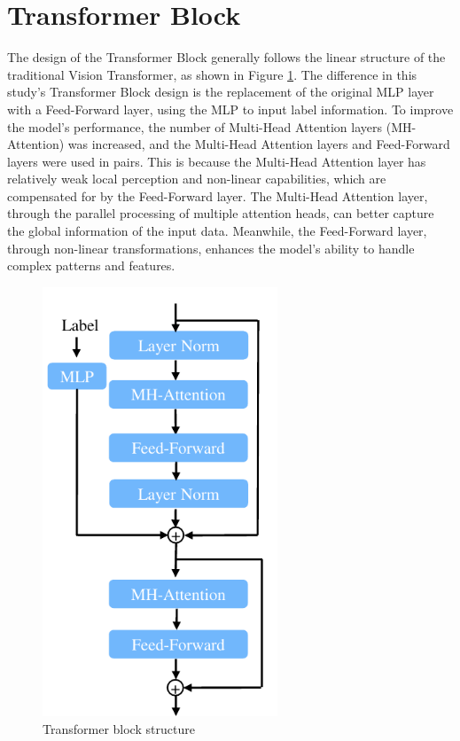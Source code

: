\documentclass[12pt]{report}
\begin{document}
\section{Transformer Block}
The design of the Transformer Block generally follows the linear structure of the traditional Vision Transformer, as shown in Figure \ref{fig:Transformer_Block}. The difference in this study's Transformer Block design is the replacement of the original MLP layer with a Feed-Forward layer, using the MLP to input label information. To improve the model's performance, the number of Multi-Head Attention layers (MH-Attention) was increased, and the Multi-Head Attention layers and Feed-Forward layers were used in pairs. This is because the Multi-Head Attention layer has relatively weak local perception and non-linear capabilities, which are compensated for by the Feed-Forward layer. The Multi-Head Attention layer, through the parallel processing of multiple attention heads, can better capture the global information of the input data. Meanwhile, the Feed-Forward layer, through non-linear transformations, enhances the model's ability to handle complex patterns and features.

\begin{figure}[thbp]
    \centering
    \includegraphics[width=7cm]{image/Transformer_Block.pdf}
    \caption{Transformer block structure}
    \label{fig:Transformer_Block}
\end{figure}
\end{document}
